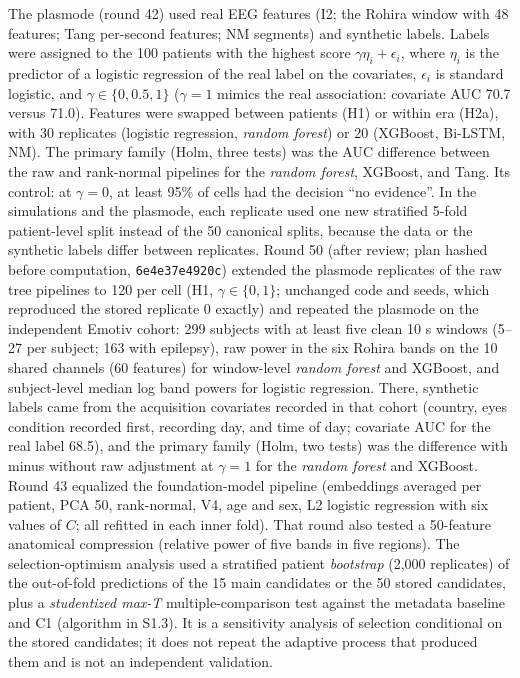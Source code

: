 The plasmode (round 42) used real EEG features (I2; the Rohira window with 48 features; Tang per-second features; NM segments) and synthetic labels. Labels were assigned to the 100 patients with the highest score $\gamma\eta_i+\epsilon_i$, where $\eta_i$ is the predictor of a logistic regression of the real label on the covariates, $\epsilon_i$ is standard logistic, and $\gamma\in\{0,0.5,1\}$ ($\gamma=1$ mimics the real association: covariate AUC 70.7 versus 71.0). Features were swapped between patients (H1) or within era (H2a), with 30 replicates (logistic regression, \textit{random forest}) or 20 (XGBoost, Bi-LSTM, NM). The primary family (Holm, three tests) was the AUC difference between the raw and rank-normal pipelines for the \textit{random forest}, XGBoost, and Tang. Its control: at $\gamma=0$, at least 95\% of cells had the decision ``no evidence''.
In the simulations and the plasmode, each replicate used one new stratified 5-fold patient-level split instead of the 50 canonical splits, because the data or the synthetic labels differ between replicates. Round 50 (after review; plan hashed before computation, \texttt{6e4e37e4920c}) extended the plasmode replicates of the raw tree pipelines to 120 per cell (H1, $\gamma\in\{0,1\}$; unchanged code and seeds, which reproduced the stored replicate 0 exactly) and repeated the plasmode on the independent Emotiv cohort: 299 subjects with at least five clean 10 s windows (5--27 per subject; 163 with epilepsy), raw power in the six Rohira bands on the 10 shared channels (60 features) for window-level \textit{random forest} and XGBoost, and subject-level median log band powers for logistic regression. There, synthetic labels came from the acquisition covariates recorded in that cohort (country, eyes condition recorded first, recording day, and time of day; covariate AUC for the real label 68.5), and the primary family (Holm, two tests) was the difference with minus without raw adjustment at $\gamma=1$ for the \textit{random forest} and XGBoost.
Round 43 equalized the foundation-model pipeline (embeddings averaged per patient, PCA 50, rank-normal, V4, age and sex, L2 logistic regression with six values of $C$; all refitted in each inner fold). That round also tested a 50-feature anatomical compression (relative power of five bands in five regions). The selection-optimism analysis used a stratified patient \textit{bootstrap} (2,000 replicates) of the out-of-fold predictions of the 15 main candidates or the 50 stored candidates, plus a \textit{studentized max-T} multiple-comparison test against the metadata baseline and C1 (algorithm in S1.3). It is a sensitivity analysis of selection conditional on the stored candidates; it does not repeat the adaptive process that produced them and is not an independent validation.
